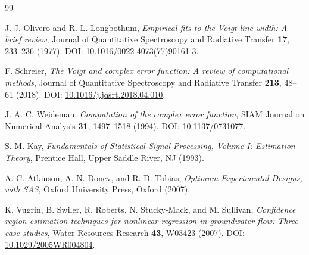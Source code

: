 \documentclass[aps,pre,amsmath,amssymb]{revtex4-2}
\begin{document}
\begin{thebibliography}{99}

J. J. Olivero and R. L. Longbothum,
\textit{Empirical fits to the Voigt line width: A brief review},
Journal of Quantitative Spectroscopy and Radiative Transfer \textbf{17}, 233--236 (1977).
DOI: \href{https://doi.org/10.1016/0022-4073(77)90161-3}{10.1016/0022-4073(77)90161-3}.

F. Schreier,
\textit{The Voigt and complex error function: A review of computational methods},
Journal of Quantitative Spectroscopy and Radiative Transfer \textbf{213}, 48--61 (2018).
DOI: \href{https://doi.org/10.1016/j.jqsrt.2018.04.010}{10.1016/j.jqsrt.2018.04.010}.

J. A. C. Weideman,
\textit{Computation of the complex error function},
SIAM Journal on Numerical Analysis \textbf{31}, 1497--1518 (1994).
DOI: \href{https://doi.org/10.1137/0731077}{10.1137/0731077}.

S. M. Kay,
\textit{Fundamentals of Statistical Signal Processing, Volume I: Estimation Theory},
Prentice Hall, Upper Saddle River, NJ (1993).

A. C. Atkinson, A. N. Donev, and R. D. Tobias,
\textit{Optimum Experimental Designs, with SAS},
Oxford University Press, Oxford (2007).

K. Vugrin, B. Swiler, R. Roberts, N. Stucky-Mack, and M. Sullivan,
\textit{Confidence region estimation techniques for nonlinear regression in groundwater flow: Three case studies},
Water Resources Research \textbf{43}, W03423 (2007).
DOI: \href{https://doi.org/10.1029/2005WR004804}{10.1029/2005WR004804}.

\end{thebibliography}
\end{document}
